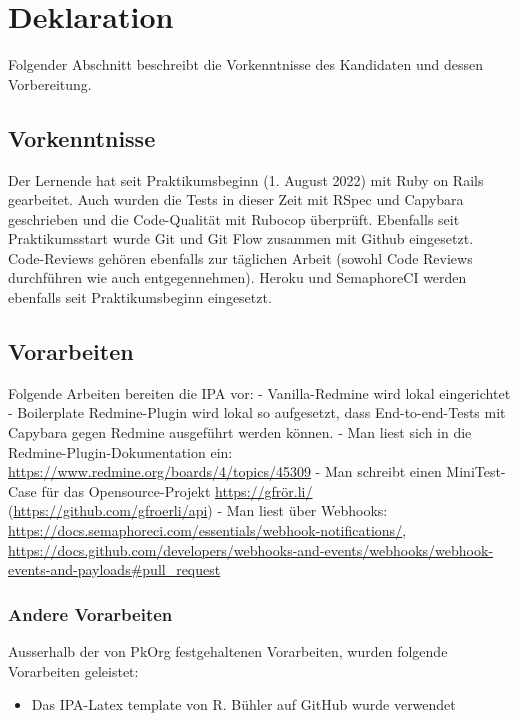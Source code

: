 \chapter{Deklaration}
\label{chap:declaration}

Folgender Abschnitt beschreibt die Vorkenntnisse des Kandidaten und dessen Vorbereitung.

\section{Vorkenntnisse}

Der Lernende hat seit Praktikumsbeginn (1. August 2022) mit Ruby on Rails gearbeitet. Auch wurden die Tests in dieser Zeit mit RSpec und Capybara geschrieben und die Code-Qualität mit Rubocop überprüft. Ebenfalls seit Praktikumsstart wurde Git und Git Flow zusammen mit Github eingesetzt. Code-Reviews gehören ebenfalls zur täglichen Arbeit (sowohl Code Reviews durchführen wie auch entgegennehmen). Heroku und SemaphoreCI werden ebenfalls seit Praktikumsbeginn eingesetzt.

\section{Vorarbeiten}

Folgende Arbeiten bereiten die IPA vor: \newline
- Vanilla-Redmine wird lokal eingerichtet \newline
- Boilerplate Redmine-Plugin wird lokal so aufgesetzt, dass End-to-end-Tests mit Capybara gegen Redmine ausgeführt werden können. \newline
- Man liest sich in die Redmine-Plugin-Dokumentation ein: \url{https://www.redmine.org/boards/4/topics/45309} \newline
- Man schreibt einen MiniTest-Case für das Opensource-Projekt \url{https://gfrör.li/} (\url{https://github.com/gfroerli/api}) \newline
- Man liest über Webhooks: \url{https://docs.semaphoreci.com/essentials/webhook-notifications/}, \url{https://docs.github.com/developers/webhooks-and-events/webhooks/webhook-events-and-payloads\#pull\_request} \newline

\subsection{Andere Vorarbeiten}
Ausserhalb der von PkOrg festgehaltenen Vorarbeiten, wurden folgende Vorarbeiten geleistet:
\begin{itemize}
    \item Das IPA-Latex template von R. Bühler auf GitHub wurde verwendet \cite{Buhler_ipa-template_2022}
\end{itemize}

